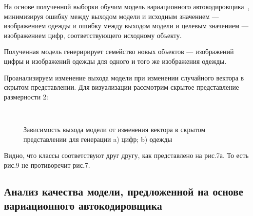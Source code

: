 На основе полученной выборки обучим модель вариационного автокодировщика~\cite{VAE}, минимизируя ошибку между выходом модели и исходным значением --- изображением одежды и ошибку между выходом модели и целевым значением --- изображением цифр, соответствующего исходному объекту.

Полученная модель генеририрует семейство новых объектов --- изображений цифры и изображений одежды для одного и того же изображения одежды.

\newpage

Проанализируем изменение выхода модели при изменении случайного вектора в скрытом представлении. Для визуализации рассмотрим скрытое представление размерности 2:

\begin{figure}[h!t]\center
{}
\qquad
{}\\
\caption{Зависимость выхода модели от изменения вектора в скрытом представлении для генерации a) цифр; b) одежды}
\end{figure}

Видно, что классы соответствуют друг другу, как представлено на рис.7а. То есть рис.9 не противоречит рис.7.

\subsection{Анализ качества модели, предложенной на основе вариационного автокодировщика}


